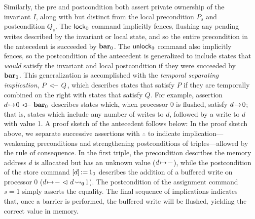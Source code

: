 \documentclass[11pt]{report}
\begin{document}
Similarly, the pre and postcondition both assert private ownership of the invariant $I$, along with but distinct from the local precondition $P_s$ and postcondition $Q_s$. The $\operatorname{\mathsf{lock}}_0$ command implicitly fences, flushing any pending writes described by the invariant or local state, and so the entire precondition in the antecedent is succeeded by $\mathbf{bar}_{0}$. The $\operatorname{\mathsf{unlock}}_0$ command also implicitly fences, so the postcondition of the antecedent is generalized to include states that \emph{would} satisfy the invariant and local postcondition if they were succeeded by $\mathbf{bar}_{0}$. This generalization is accomplished with the \emph{temporal separating implication}, $P \fseqri Q$, which describes states that satisfy $P$ if they are temporally combined on the right with states that satisfy $Q$. For example, assertion $d \fpointsto 0 \fseqri \fbar{0}$ describes states which, when processor 0 is flushed, satisfy $d \!\mapsto\! 0$; that is, states which include any number of writes to $d$, followed by a write to $d$ with value 1. 
A proof sketch of the antecedent follows below: 
 In the proof sketch above, we separate successive assertions with $\therefore$ to indicate implication---weakening preconditions and strengthening postconditions of triples---allowed by the rule of consequence. In the first triple, the precondition describes the memory address $d$ is allocated but has an unknown value ($d \!\mapsto\! -$), while the postcondition of the store command $\left[ d \right] \operatorname{:\!=} 1_0$ describes the addition of a buffered write on processor 0 ($d \!\mapsto\! - \operatorname{\,\vartriangleleft\,} d \!\leadsto_{0}\! 1$). The postcondition of the assignment command $s = 1$ simply asserts the equality. The final sequence of implications indicates that, once a barrier is performed, the buffered write will be flushed, yielding the correct value in memory.  
\end{document}
